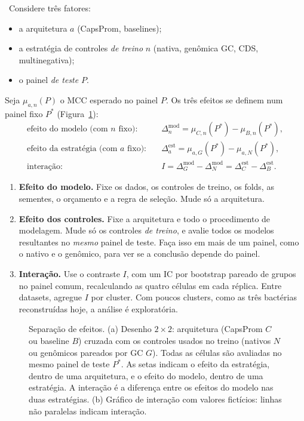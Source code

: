\documentclass[11pt,a4paper]{article}
\newcommand{\etiqueta}[2]{\tcbox[on line, colback=#1!10, colframe=#1!75!black,
  boxrule=0.4pt, arc=1.2pt, left=1.5pt, right=1.5pt, top=0pt, bottom=0pt,
  fontupper=\sffamily\scriptsize\bfseries]{#2}}
\newcommand{\rec}{\etiqueta{oiVerm}{Recomendação}}
\begin{document}
\rec\ Considere três fatores:
\begin{itemize}[leftmargin=1.4em]
\item a arquitetura $a$ (CapsProm, baselines);
\item a estratégia de controles \emph{de treino} $n$ (nativa, genômica GC, CDS, multinegativa);
\item o painel \emph{de teste} $P$.
\end{itemize}
Seja $\mu_{a,n}(P)$ o MCC esperado no painel $P$. Os três efeitos se definem num painel fixo $P^\ast$ (Figura~\ref{fig:fatorial}):
\begin{align}
\text{efeito do modelo (com $n$ fixo):}\quad & \Delta^{\text{mod}}_n=\mu_{C,n}(P^\ast)-\mu_{B,n}(P^\ast),\\
\text{efeito da estratégia (com $a$ fixo):}\quad & \Delta^{\text{est}}_a=\mu_{a,G}(P^\ast)-\mu_{a,N}(P^\ast),\\
\text{interação:}\quad & I=\Delta^{\text{mod}}_G-\Delta^{\text{mod}}_N=\Delta^{\text{est}}_C-\Delta^{\text{est}}_B .
\end{align}

\begin{enumerate}[leftmargin=1.4em]
\item \textbf{Efeito do modelo.} Fixe os dados, os controles de treino, os folds, as sementes, o orçamento e a regra de seleção. Mude só a arquitetura.
\item \textbf{Efeito dos controles.} Fixe a arquitetura e todo o procedimento de modelagem. Mude só os controles \emph{de treino}, e avalie todos os modelos resultantes no \emph{mesmo} painel de teste. Faça isso em mais de um painel, como o nativo e o genômico, para ver se a conclusão depende do painel.
\item \textbf{Interação.} Use o contraste $I$, com um IC por bootstrap pareado de grupos no painel comum, recalculando as quatro células em cada réplica. Entre datasets, agregue $I$ por cluster. Com poucos clusters, como as três bactérias reconstruídas hoje, a análise é exploratória.
\end{enumerate}

\begin{figure}[t]
\centering

\caption{Separação de efeitos. (a) Desenho $2\times2$: arquitetura (CapsProm $C$ ou baseline $B$) cruzada com os controles usados no treino (nativos $N$ ou genômicos pareados por GC $G$). Todas as células são avaliadas no mesmo painel de teste $P^\ast$. As setas indicam o efeito da estratégia, dentro de uma arquitetura, e o efeito do modelo, dentro de uma estratégia. A interação é a diferença entre os efeitos do modelo nas duas estratégias. (b) Gráfico de interação com valores fictícios: linhas não paralelas indicam interação.}
\label{fig:fatorial}
\end{figure}
\end{document}
